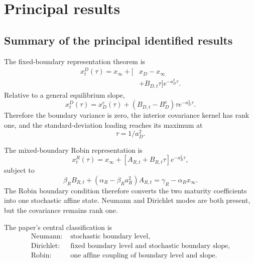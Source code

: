 \documentclass[12pt]{article}
\numberwithin{equation}{subsection}
\begin{document}
\section{Principal results}

\subsection{Summary of the principal identified results}

The fixed-boundary representation theorem is
\begin{equation}
\begin{aligned}
x^D_t(\tau)
=
x_\infty+
\Big[&x_D-x_\infty
\\
&+B_{D,t}\tau
\Big]e^{-a_D^2\tau}.
\end{aligned}
\end{equation}
Relative to a general equilibrium slope,
\begin{equation}
x^D_t(\tau)
=
x_D^e(\tau)+(B_{D,t}-B_D^e)\tau e^{-a_D^2\tau}.
\end{equation}
Therefore the boundary variance is zero, the interior covariance kernel has rank one, and the standard-deviation loading reaches its maximum at
\begin{equation}
\tau=1/a_D^2.
\end{equation}

The mixed-boundary Robin representation is
\begin{equation}
x^R_t(\tau)
=
x_\infty+
\left[A_{R,t}+B_{R,t}\tau\right]e^{-a_R^2\tau},
\end{equation}
subject to
\begin{equation}
\beta_RB_{R,t}
+
(\alpha_R-\beta_Ra_R^2)A_{R,t}
=
\gamma_R-\alpha_Rx_\infty.
\end{equation}
The Robin boundary condition therefore converts the two maturity coefficients into one stochastic affine state. Neumann and Dirichlet modes are both present, but the covariance remains rank one.

The paper's central classification is
\begin{equation}
\begin{aligned}
\text{Neumann: }&\text{stochastic boundary level},\\
\text{Dirichlet: }&\text{fixed boundary level and stochastic boundary slope},\\
\text{Robin: }&\text{one affine coupling of boundary level and slope}.
\end{aligned}
\end{equation}
\end{document}
